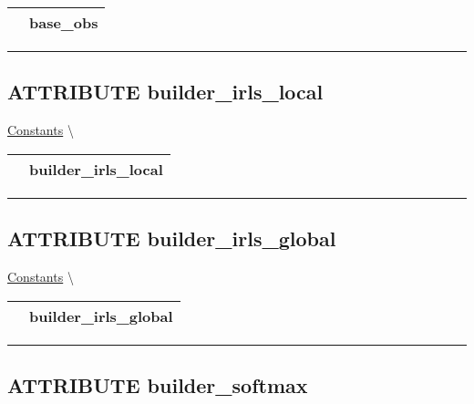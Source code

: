 {\renewcommand{\arraystretch}{1.5}
\begin{tabularx}{\textwidth}{|>{\raggedright\arraybackslash}l|X|}
\hline
\hspace{0pt}\mytexttt{\color{red} } & \textbf{base\_obs} \\
\hline
\end{tabularx}
}

\par


\rule{\linewidth}{0.5pt}
\subsection*{\textsf{\colorbox{headtoc}{\color{white} ATTRIBUTE}
builder\_irls\_local}}

\hypertarget{ecldoc:logisticregression.constants.builder_irls_local}{}
\hspace{0pt} \hyperlink{ecldoc:LogisticRegression.Constants}{Constants} \textbackslash 

{\renewcommand{\arraystretch}{1.5}
\begin{tabularx}{\textwidth}{|>{\raggedright\arraybackslash}l|X|}
\hline
\hspace{0pt}\mytexttt{\color{red} } & \textbf{builder\_irls\_local} \\
\hline
\end{tabularx}
}

\par


\rule{\linewidth}{0.5pt}
\subsection*{\textsf{\colorbox{headtoc}{\color{white} ATTRIBUTE}
builder\_irls\_global}}

\hypertarget{ecldoc:logisticregression.constants.builder_irls_global}{}
\hspace{0pt} \hyperlink{ecldoc:LogisticRegression.Constants}{Constants} \textbackslash 

{\renewcommand{\arraystretch}{1.5}
\begin{tabularx}{\textwidth}{|>{\raggedright\arraybackslash}l|X|}
\hline
\hspace{0pt}\mytexttt{\color{red} } & \textbf{builder\_irls\_global} \\
\hline
\end{tabularx}
}

\par


\rule{\linewidth}{0.5pt}
\subsection*{\textsf{\colorbox{headtoc}{\color{white} ATTRIBUTE}
builder\_softmax}}

